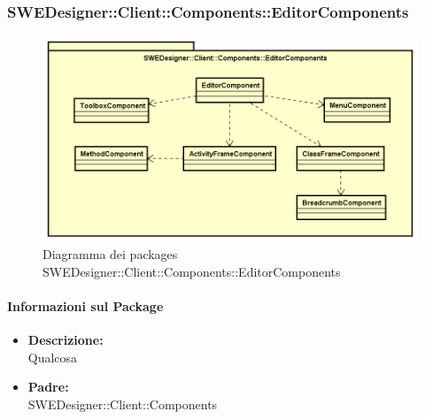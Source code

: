 		\subsubsection{SWEDesigner::Client::Components::EditorComponents}
		 \begin{figure}[h!]
		\centering
		\includegraphics[scale=0.4]{Disegnetti/SWEDesigner__Client__Components__EditorComponents.png}
		\caption{Diagramma dei packages SWEDesigner::Client::Components::EditorComponents}
 		\end{figure}
		\paragraph{Informazioni sul Package}
		\begin{itemize}				
			\item \textbf{Descrizione: }\\
			Qualcosa
			\item \textbf{Padre: }\\ SWEDesigner::Client::Components
		\end{itemize}
		
